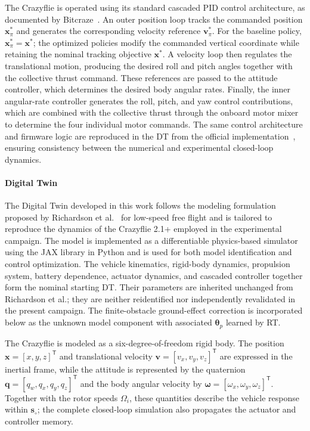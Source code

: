 \documentclass[journal]{IEEEtran}
\begin{document}
The Crazyflie is operated using its standard cascaded PID control architecture, as documented by Bitcraze~\cite{BitcrazeControllers}. An outer position loop tracks the commanded position $\mathbf{x}_{\pi}^{\ast}$ and generates the corresponding velocity reference $\mathbf{v}_{\pi}^{\ast}$. For the baseline policy, $\mathbf{x}_{\pi}^{\ast}=\mathbf{x}^{\ast}$; the optimized policies modify the commanded vertical coordinate while retaining the nominal tracking objective $\mathbf{x}^{\ast}$. A velocity loop then regulates the translational motion, producing the desired roll and pitch angles together with the collective thrust command. These references are passed to the attitude controller, which determines the desired body angular rates. Finally, the inner angular-rate controller generates the roll, pitch, and yaw control contributions, which are combined with the collective thrust through the onboard motor mixer to determine the four individual motor commands. The same control architecture and firmware logic are reproduced in the DT from the official implementation~\cite{BitcrazeFirmware}, ensuring consistency between the numerical and experimental closed-loop dynamics.

\paragraph*{Digital Twin}
\label{sec:digital_twin}

The Digital Twin developed in this work follows the modeling formulation proposed by Richardson et al.~\cite{Richardson2025} for low-speed free flight and is tailored to reproduce the dynamics of the Crazyflie 2.1+ employed in the experimental campaign. The model is implemented as a differentiable physics-based simulator using the JAX library in Python and is used for both model identification and control optimization. The vehicle kinematics, rigid-body dynamics, propulsion system, battery dependence, actuator dynamics, and cascaded controller together form the nominal starting DT. Their parameters are inherited unchanged from Richardson et al.; they are neither reidentified nor independently revalidated in the present campaign. The finite-obstacle ground-effect correction is incorporated below as the unknown model component with associated $\boldsymbol{\theta}_p$ learned by RT.

The Crazyflie is modeled as a six-degree-of-freedom rigid body. The position $\mathbf{x}=[x,y,z]^{\mathsf T}$ and translational velocity $\mathbf{v}=[v_x,v_y,v_z]^{\mathsf T}$ are expressed in the inertial frame, while the attitude is represented by the quaternion $\mathbf{q}=[q_w,q_x,q_y,q_z]^{\mathsf T}$ and the body angular velocity by $\boldsymbol{\omega}=[\omega_x,\omega_y,\omega_z]^{\mathsf T}$. Together with the rotor speeds $\Omega_i$, these quantities describe the vehicle response within $\mathbf s_\circ$; the complete closed-loop simulation also propagates the actuator and controller memory.
\end{document}
